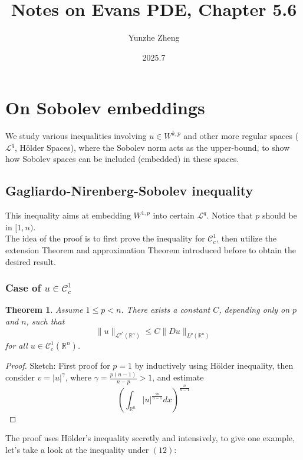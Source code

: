 \documentclass{article}
\title{Notes on Evans PDE, Chapter 5.6}
\author{Yunzhe Zheng}
\date{2025.7}
\begin{document}
\maketitle

\section{On Sobolev embeddings}

\indent\indent We study various inequalities involving $u\in W^{k, p}$ and other more regular spaces ($\mathscr{L}^q$, Hölder Spaces), where the Sobolev norm acts as the upper-bound, to show how Sobolev spaces can be included (embedded) in these spaces.

\subsection{Gagliardo-Nirenberg-Sobolev inequality}

\indent\indent This inequality aims at embedding $W^{1, p}$ into certain $\mathscr{L}^{q}$. Notice that $p$ should be in $[1, n)$. \\
\indent The idea of the proof is to first prove the inequality for $\mathscr{C}^1_c$, then utilize the extension Theorem and approximation Theorem introduced before to obtain the desired result. 

\subsubsection{Case of $u\in\mathscr{C}^1_{c}$}

\newtheorem{Th}{Theorem}

\begin{Th}
    Assume $1\leq p<n$. There exists a constant $C$, depending only on $p$ and $n$, such that
    $$
    \|u\|_{\mathscr{L}^{p^*}(\mathbb{R}^{n})}\leq C\|Du\|_{L^{p}(\mathbb{R}^{n})}
    $$
    for all $u\in\mathscr{C}^{1}_{c}(\mathbb{R}^n)$.
\end{Th}

\begin{proof}
    Sketch: First proof for $p=1$ by inductively using Hölder inequality, then consider $v=|u|^{\gamma}$, where $\gamma=\frac{p(n-1)}{n-p}>1$, and estimate 
    $$
    \left(\int_{\mathbb{R}^n}|u|^{\frac{\gamma n}{n-1}}dx\right)^{\frac{n}{n-1}}
    $$
\end{proof}
The proof uses Hölder's inequality secretly and intensively, to give one example, let's take a look at the inequality under $(12)$: 
\end{document}
